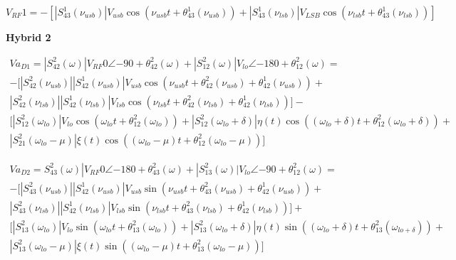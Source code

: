 \begin{equation}
    \label{eq:hyb1_1}
    V_{RF}1 = -\left[|S_{43}^1(\nu_{usb})|V_{usb}\cos(\nu_{usb}t+\theta_{43}^1(\nu_{usb}))+|S_{43}^1(\nu_{lsb})|V_{LSB}\cos(\nu_{lsb}t+\theta_{43}^1(\nu_{lsb}))\right]
\end{equation}


\vspace{0.5cm}
\textbf{Hybrid 2}
\vspace{0.5cm}

\begin{equation}
\begin{gathered}
    Va_{D1} = |S_{42}^2(\omega)|V_{RF}0\angle{-90+\theta_{42}^2(\omega)} +|S_{12}^2(\omega)|V_{lo}\angle{-180+\theta_{12}^2(\omega)} = \\
    -\big[|S_{42}^2(\nu_{usb})||S_{42}^1(\nu_{usb})|V_{usb}\cos(\nu_{usb}t+\theta_{42}^2(\nu_{usb})+\theta_{42}^1(\nu_{usb}))+\\|S_{42}^2(\nu_{lsb})||S_{42}^1(\nu_{lsb})|V_{lsb}\cos(\nu_{lsb}t+\theta_{42}^2(\nu_{lsb})+\theta_{42}^1(\nu_{lsb})) \big]-\\
    \big[|S_{12}^2(\omega_{lo})|V_{lo}\cos(\omega_{lo}t+\theta_{12}^2(\omega_{lo}))+ |S_{12}^2(\omega_{lo}+\delta)|\eta(t)\cos((\omega_{lo}+\delta)t+\theta_{12}^2(\omega_{lo}+\delta))+\\|S_{21}^2(\omega_{lo}-\mu)|\xi(t)\cos((\omega_{lo}-\mu)t+\theta_{12}^2(\omega_{lo}-\mu)) \big]
\end{gathered}
\end{equation}

\vspace{0.5cm}

\begin{equation}
\begin{gathered}
    Va_{D2} = S_{43}^2(\omega)|V_{RF}0\angle{-180+\theta_{43}^2(\omega)} +|S_{13}^2(\omega)|V_{lo}\angle{-90+\theta_{12}^2(\omega)} = \\
    -\big[|S_{43}^2(\nu_{usb})||S_{42}^1(\nu_{usb})|V_{usb}\sin(\nu_{usb}t+\theta_{43}^2(\nu_{usb})+\theta_{42}^1(\nu_{usb}))+\\|S_{43}^2(\nu_{lsb})||S_{42}^1(\nu_{lsb})|V_{lsb}\sin(\nu_{lsb}t+\theta_{43}^2(\nu_{lsb})+\theta_{42}^1(\nu_{lsb})) \big]+ \\
    \big[|S_{13}^2(\omega_{lo})|V_{lo}\sin(\omega_{lo}t+\theta_{13}^2(\omega_{lo}))+|S_{13}^2(\omega_{lo}+\delta)|\eta(t)\sin((\omega_{lo}+\delta)t+\theta_{13}^2(\omega_{lo+\delta}))+\\
    |S_{13}^2(\omega_{lo}-\mu)|\xi(t)\sin((\omega_{lo}-\mu)t+\theta_{13}^2(\omega_{lo}-\mu))\big]
\end{gathered}
\end{equation}

